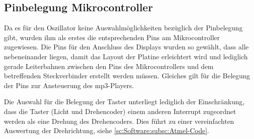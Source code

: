 \documentclass[journal, a4paper]{IEEEtran}
\begin{document}
	\subsection{Pinbelegung Mikrocontroller}
		\label{sc:Hardware:subsc:Pinbelegung}
		Da es für den Oszillator keine Auswahlmöglichkeiten bezüglich der Pinbelegung gibt, wurden ihm als erstes die entsprechenden Pins am Mikrocontroller zugewiesen. Die Pins für den Anschluss des Displays wurden so gewählt, dass alle nebeneinander liegen, damit das Layout der Platine erleichtert wird und lediglich gerade Leiterbahnen zwischen den Pins des Mikrocontrollers und dem betreffenden Steckverbinder erstellt werden müssen. Gleiches gilt für die Belegung der Pins zur Ansteuerung des mp3-Players.\par
		Die Auswahl für die Belegung der Taster unterliegt lediglich der Einschränkung, dass die Taster (Licht und Drehencoder) einem anderen Interrupt zugeordnet werden als eine Drehung des Drehencoders. Dies führt zu einer vereinfachten Auswertung der Drehrichtung, siehe \ref{sc:Software:subsc:Atmel-Code}.
\end{document}
